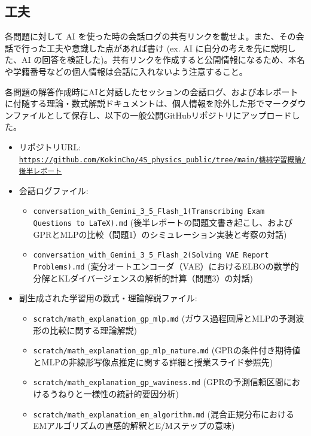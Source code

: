 \documentclass[11pt,a4paper,dvipdfmx]{article}
\numberwithin{equation}{section}
\newenvironment{proofbox}[0]
{
    \begin{mdframed}[
        linecolor=black,
        topline=false,
        bottomline=false,
        rightline=false,
        leftline=true,
        linewidth=2pt,
        innerleftmargin=10pt,
        skipabove=\baselineskip,
        skipbelow=\baselineskip,
    ]
}
{
    \end{mdframed}
}
\newenvironment{note}[0]
{
    \begin{tcolorbox}[sharp corners, colframe=gray!20, colback=gray!20, width=\textwidth]
}
{
    \end{tcolorbox}
}
\begin{document}
\subsection*{工夫}
\begin{note}
各問題に対して AI を使った時の会話ログの共有リンクを載せよ。また、その会話で行った工夫や意識した点があれば書け (ex. AI に自分の考えを先に説明した、AI の回答を検証した)。共有リンクを作成すると公開情報になるため、本名や学籍番号などの個人情報は会話に入れないよう注意すること。
\end{note}
\begin{proofbox}
各問題の解答作成時にAIと対話したセッションの会話ログ、および本レポートに付随する理論・数式解説ドキュメントは、個人情報を除外した形でマークダウンファイルとして保存し、以下の一般公開GitHubリポジトリにアップロードした。
\begin{itemize}
    \item リポジトリURL: \href{https://github.com/KokinCho/4S_physics_public/tree/main/\%E6\%A9\%9F\%E6\%A2\%B0\%E5%AD\%A6\%E7%BF%92%E6%A6%82%E8%AB%96/\%E5%BE%8C%E5%8D%8A%E3%83%AC%E3%83%9D%E3%83%BC%E3%83%88}{\texttt{https://github.com/KokinCho/4S\_physics\_public/tree/main/機械学習概論/後半レポート}}
    \item 会話ログファイル: 
    \begin{itemize}
        \item \texttt{conversation\_with\_Gemini\_3\_5\_Flash\_1(Transcribing Exam Questions to LaTeX).md} (後半レポートの問題文書き起こし、およびGPRとMLPの比較（問題1）のシミュレーション実装と考察の対話)
        \item \texttt{conversation\_with\_Gemini\_3\_5\_Flash\_2(Solving VAE Report Problems).md} (変分オートエンコーダ（VAE）におけるELBOの数学的分解とKLダイバージェンスの解析的計算（問題3）の対話)
    \end{itemize}
    \item 副生成された学習用の数式・理論解説ファイル: 
    \begin{itemize}
        \item \texttt{scratch/math\_explanation\_gp\_mlp.md} (ガウス過程回帰とMLPの予測波形の比較に関する理論解説)
        \item \texttt{scratch/math\_explanation\_gp\_mlp\_nature.md} (GPRの条件付き期待値とMLPの非線形写像点推定に関する詳細と授業スライド参照先)
        \item \texttt{scratch/math\_explanation\_gp\_waviness.md} (GPRの予測信頼区間におけるうねりと一様性の統計的要因分析)
        \item \texttt{scratch/math\_explanation\_em\_algorithm.md} (混合正規分布におけるEMアルゴリズムの直感的解釈とE/Mステップの意味)

\end{itemize}
\end{itemize}
\end{proofbox}
\end{document}
